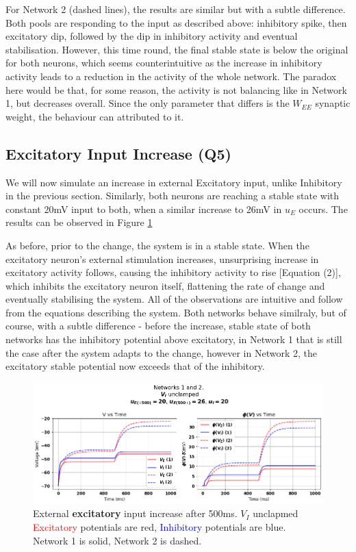\documentclass[10pt,twocolumn]{article}
\begin{document}
For Network 2 (dashed lines), the results are similar but with a subtle difference. Both pools
are responding to the input as described above: inhibitory spike, then excitatory dip,
followed by the dip in inhibitory activity and eventual stabilisation. However,
this time round, the final stable state is below the original for both neurons,
which seems counterintuitive as the increase in inhibitory activity leads
to a reduction in the activity of the whole network. The paradox here would
be that, for some reason, the activity is not balancing like in Network 1,
but decreases overall. Since the only parameter that differs is the
$W_{EE}$ synaptic weight, the behaviour can attributed to it.

\subsection{Excitatory Input Increase (Q5)}
We will now simulate an increase in external Excitatory input, unlike Inhibitory
in the previous section. Similarly, both neurons are reaching a stable state
with constant 20mV input to both, when a similar increase to 26mV in $u_E$ occurs.
The results can be observed in Figure \ref{fig:e-input-unclamped}

As before, prior to the change, the system is in a stable state. When the
excitatory neuron's external stimulation increases, unsurprising increase
in excitatory activity follows, causing the inhibitory activity to rise
    [Equation (2)], which inhibits the excitatory neuron itself, flattening
the rate of change and eventually stabilising the system.
All of the observations are intuitive and follow from the equations
describing the system. Both networks behave similraly, but of course,
with a subtle difference - before the increase, stable state of
both networks has the inhibitory potential above excitatory,
in Network 1 that is still the case after the system adapts to the
change, however in Network 2, the excitatory stable potential now
exceeds that of the inhibitory.

\begin{figure}
    \centering
    \captionsetup{justification=centering}
    \includegraphics[width=1\textwidth]{images/12-E_input.png}
    \caption{External \textbf{excitatory} input increase after 500ms. $V_I$ unclapmed \hspace{\textwidth}
        \textcolor{red}{Excitatory} potentials are red, \textcolor{blue}{Inhibitory} potentials are blue.\hspace{\textwidth}
        Network 1 is solid, Network 2 is dashed.}
    \label{fig:e-input-unclamped}
\end{figure}
\end{document}
